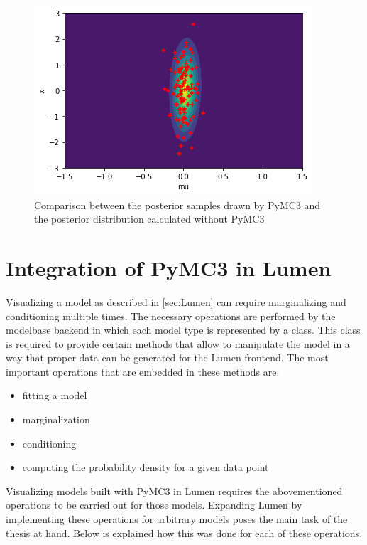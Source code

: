 \documentclass{article}
\begin{document}
\begin{figure}
	\includegraphics[width=\textwidth]{images/PyMC3_joint_posterior_samples_simple_model_2.png}
	\caption[Comparison between the posterior samples drawn by PyMC3 and the posterior distribution calculated without PyMC3]{Comparison between the posterior samples drawn by PyMC3 and the posterior distribution calculated without PyMC3}
	\label{fig:PyMC3_joint_posterior_samples_simple_model}
\end{figure}


\section{Integration of PyMC3 in Lumen}
\label{sec:lumen_pymc3_integration}
Visualizing a model as described in \autoref{sec:Lumen} can require marginalizing and conditioning multiple times. The necessary operations are performed by the modelbase backend in which each model type is represented by a class. This class is required to provide certain methods that allow to manipulate the model in a way that proper data can be generated for the Lumen frontend. The most important operations that are embedded in these methods are:
\begin{itemize}
	\item fitting a model
	\item marginalization
	\item conditioning
	\item computing the probability density for a given data point
\end{itemize}
Visualizing models built with PyMC3 in Lumen requires the abovementioned operations to be carried out for those models. Expanding Lumen by implementing these operations for arbitrary models poses the main task of the thesis at hand. Below is explained how this was done for each of these operations.
\end{document}
